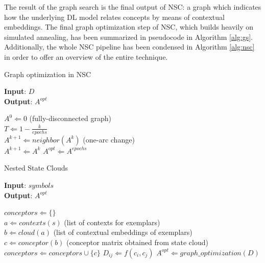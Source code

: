 The result of the graph search is the final output of NSC: a graph which indicates how the underlying DL model relates concepts by means of contextual embeddings. The final graph optimization step of NSC, which builds heavily on simulated annealing, has been summarized in pseudocode in Algorithm \ref{alg:gs}. Additionally, the whole NSC pipeline has been condensed in Algorithm \ref{alg:nsc} in order to offer an overview of the entire technique.

\begin{algorithm}[!tbp]
    \caption{Graph optimization in NSC}
    \label{alg:gs}
    \hspace*{\algorithmicindent} \textbf{Input}: $D$ \\
    \hspace*{\algorithmicindent} \textbf{Output}: $A^{opt}$
    \begin{algorithmic}
        \STATE $A^0 \Leftarrow 0 $ (fully-disconnected graph) \\
        \STATE $T \Leftarrow 1 - \frac{k}{epochs}$ \\
        \STATE $A^{k+1} \Leftarrow neighbor(A^k)$ (one-arc change) \\
        \STATE $ A^{k+1} \Leftarrow A^{k}$
        \ENDIF
        \ENDFOR
        \STATE $A^{opt} \Leftarrow A^{epochs}$
    \end{algorithmic}
\end{algorithm}

\begin{algorithm}[!tbp]
    \caption{Nested State Clouds}
    \label{alg:nsc}
    \hspace*{\algorithmicindent} \textbf{Input}: $symbols$ \\
    \hspace*{\algorithmicindent} \textbf{Output}: $A^{opt}$
    \begin{algorithmic}
        \STATE $conceptors \Leftarrow \{\}$ \\
        \STATE $a \Leftarrow contexts(s)$ (list of contexts for exemplars) \\
        \STATE $b \Leftarrow cloud(a)$ (list of contextual embeddings of exemplars) \\
        \STATE $c \Leftarrow conceptor(b)$ (conceptor matrix obtained from state cloud)\\
        \STATE $conceptors \Leftarrow conceptors \cup \{c\}$
        \ENDFOR
        \STATE $D_{ij} \Leftarrow f(c_i, c_j)$
        \ENDFOR
        \ENDFOR
        \STATE $A^{opt} \Leftarrow graph\_optimization(D)$
    \end{algorithmic}
\end{algorithm}

